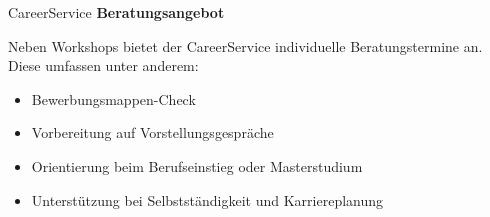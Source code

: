 \begin{initiativkarte}{CareerService}
  \textbf{Beratungsangebot}

  Neben Workshops bietet der CareerService individuelle Beratungstermine an. Diese umfassen unter anderem:

  \begin{itemize}[itemsep=2pt]
    \item Bewerbungsmappen-Check
    \item Vorbereitung auf Vorstellungsgespräche
    \item Orientierung beim Berufseinstieg oder Masterstudium
    \item Unterstützung bei Selbstständigkeit und Karriereplanung
  \end{itemize}

  \vspace{0.3cm}


  \vspace{0.6cm}
  \hawrule


\end{initiativkarte}